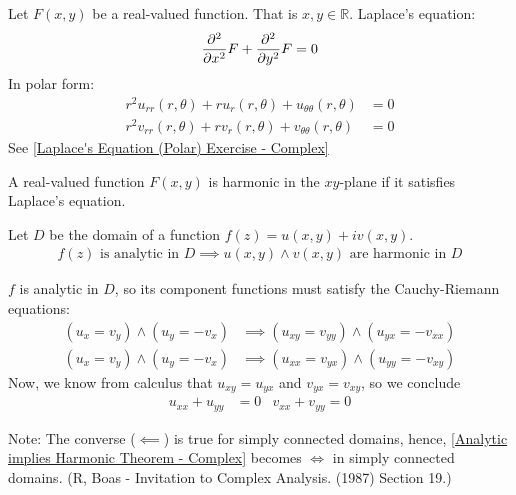 \documentclass[12pt, english]{book}
\makeatletter
\renewenvironment{proof}[1][\proofname]{\par
	\pushQED{\qed}%
	\normalfont \topsep6\p@\@plus6\p@\relax
	\list{}{%
		\settowidth{\leftmargin}{\itshape\proofname:\hskip\labelsep}%
		\setlength{\labelwidth}{0pt}%
		\setlength{\itemindent}{-\leftmargin}%
		}%
	\item[\hskip\labelsep\itshape#1\@addpunct{:}]\ignorespaces
	}{\popQED\endlist\@endpefalse}
\makeatother
\begin{document}
	\begin{definition} 
		\label{Laplace's Equation Definition - Complex}
		Let \(F(x,y)\) be a real-valued function. That is \(x,y \in \mathbb{R}\). Laplace's equation: 
		\begin{align*}
			\pdv[2]{x} F + \pdv[2]{y} F = 0
		\end{align*}
		In polar form:
		\begin{align*}
			r^2 u_{rr}(r, \theta) + ru_r(r, \theta) + u_{\theta \theta}(r, \theta) &= 0 \\
			r^2 v_{rr}(r, \theta) + rv_r(r, \theta) + v_{\theta \theta}(r, \theta) &= 0
		\end{align*}
		See \cref{Laplace's Equation (Polar) Exercise - Complex}
	\end{definition}

	\begin{definition}[Harmonic] 
		A real-valued function \(F(x,y)\) is harmonic in the \(xy\)-plane if it satisfies Laplace's equation.
	\end{definition}

	\begin{theorem}
		\label{Analytic implies Harmonic Theorem - Complex}
		Let \(D\) be the domain of a function \(f(z) = u(x,y) + iv(x,y)  \).
		\begin{align*}
			f(z) \text{ is analytic in } D \implies u(x,y) \land v(x,y) \text{ are harmonic in } D
		\end{align*}
	\end{theorem}
	\begin{proof}
		\(f\) is analytic in \(D\), so its component functions must satisfy the Cauchy-Riemann equations: 
		\begin{align*}
			(u_x = v_y)\land(u_y = -v_x) 
				&\implies (u_{xy} = v_{yy})\land(u_{yx} = -v_{xx})  \\
			(u_x = v_y)\land(u_y = -v_x) 
				&\implies (u_{xx} = v_{yx})\land(u_{yy} = -v_{xy}) 
		\end{align*}
		Now, we know from calculus that \(u_{xy} = u_{yx}\) and \(v_{yx} = v_{xy}\), so we conclude
		\begin{align*}
			u_{xx} + u_{yy} &= 0 & v_{xx} + v_{yy} = 0
		\end{align*}
	\end{proof}

	Note: The converse (\(\impliedby\)) is true for simply connected domains, hence, \cref{Analytic implies Harmonic Theorem - Complex} becomes \(\iff\) in simply connected domains. (R, Boas - Invitation to Complex Analysis. (1987) Section 19.)
	
\end{document}
